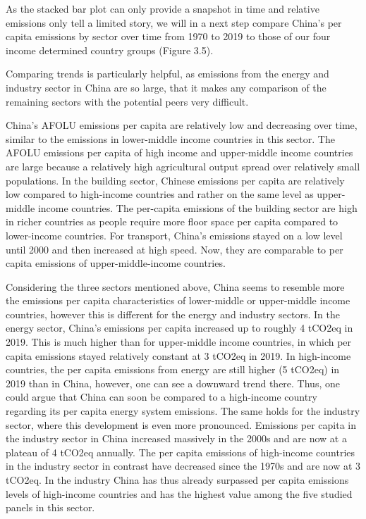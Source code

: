 \documentclass[
  12pt,
]{article}
\numberwithin{equation}{section}
\numberwithin{table}{section}
\numberwithin{figure}{section}
\begin{document}
As the stacked bar plot can only provide a snapshot in time and relative
emissions only tell a limited story, we will in a next step compare
China's per capita emissions by sector over time from 1970 to 2019 to
those of our four income determined country groups (Figure 3.5).

Comparing trends is particularly helpful, as emissions from the energy
and industry sector in China are so large, that it makes any comparison
of the remaining sectors with the potential peers very difficult.

China's AFOLU emissions per capita are relatively low and decreasing
over time, similar to the emissions in lower-middle income countries in
this sector. The AFOLU emissions per capita of high income and
upper-middle income countries are large because a relatively high
agricultural output spread over relatively small populations. In the
building sector, Chinese emissions per capita are relatively low
compared to high-income countries and rather on the same level as
upper-middle income countries. The per-capita emissions of the building
sector are high in richer countries as people require more floor space
per capita compared to lower-income countries. For transport, China's
emissions stayed on a low level until 2000 and then increased at high
speed. Now, they are comparable to per capita emissions of
upper-middle-income countries.

Considering the three sectors mentioned above, China seems to resemble
more the emissions per capita characteristics of lower-middle or
upper-middle income countries, however this is different for the energy
and industry sectors. In the energy sector, China's emissions per capita
increased up to roughly 4 tCO2eq in 2019. This is much higher than for
upper-middle income countries, in which per capita emissions stayed
relatively constant at 3 tCO2eq in 2019. In high-income countries, the
per capita emissions from energy are still higher (5 tCO2eq) in 2019
than in China, however, one can see a downward trend there. Thus, one
could argue that China can soon be compared to a high-income country
regarding its per capita energy system emissions. The same holds for the
industry sector, where this development is even more pronounced.
Emissions per capita in the industry sector in China increased massively
in the 2000s and are now at a plateau of 4 tCO2eq annually. The per
capita emissions of high-income countries in the industry sector in
contrast have decreased since the 1970s and are now at 3 tCO2eq. In the
industry China has thus already surpassed per capita emissions levels of
high-income countries and has the highest value among the five studied
panels in this sector.
\end{document}
